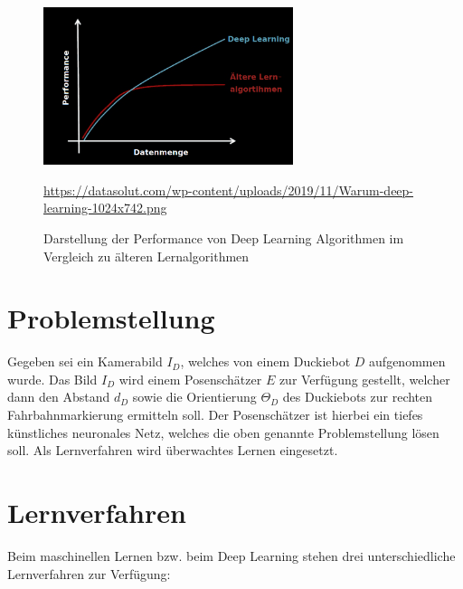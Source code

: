 \begin{figure}[H]
	\centering
	\includegraphics[width=0.65\textwidth]{kapitel3/images/Deep_Learning_Performance.png}
	\label{fig:deep-learning-performance}
	\caption{Darstellung der Performance von Deep Learning Algorithmen im Vergleich zu älteren Lernalgorithmen}
	\vspace{0.2cm}
	\quelle\url{https://datasolut.com/wp-content/uploads/2019/11/Warum-deep-learning-1024x742.png}
\end{figure}

\section{Problemstellung}

Gegeben sei ein Kamerabild $I_D$, welches von einem Duckiebot $D$ aufgenommen wurde. Das Bild $I_D$ wird einem Posenschätzer $E$ zur Verfügung gestellt, welcher dann den Abstand $d_D$ sowie die Orientierung $\Theta_D$ des Duckiebots zur rechten 
Fahrbahnmarkierung ermitteln soll. Der Posenschätzer ist hierbei ein tiefes künstliches neuronales Netz, welches die oben genannte Problemstellung lösen soll. Als Lernverfahren wird überwachtes Lernen eingesetzt.

\section{Lernverfahren}

Beim maschinellen Lernen bzw. beim Deep Learning stehen drei unterschiedliche Lernverfahren zur Verfügung:

